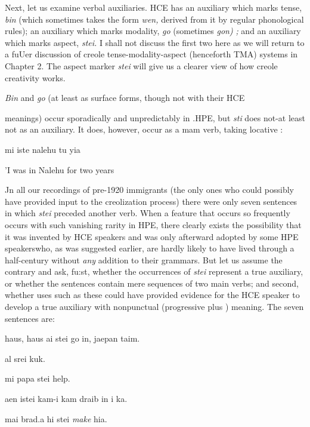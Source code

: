 Next, let us examine verbal auxiliaries. HCE has an auxiliary which marks tense, \textit{bin} (which sometimes takes the form \textit{wen,} derived from it by regular phonological rules); an auxiliary which marks modal\-ity, \textit{go }(sometimes \textit{go}\textit{n}\textit{)} \textit{; }and an auxiliary which marks aspect, \textit{stei.} I shall not discuss the first two here as we will return to a fuUer discus\-sion of creole tense-modality-aspect (henceforth TMA) systems in Chapter 2. The aspect marker \textit{stei} will give us a clearer view of how creole creativity works.

\textit{Bin }and \textit{go }(at least as surface forms, though not with their HCE

meanings) occur sporadically and unpredictably in .HPE, but \textit{s}\textit{t}\textit{i} does not-at least not as an auxiliary. It does, however, occur as a mam verb, taking locative :

\ea\label{ex:44}
 mi iste nalehu tu yia
\glt
\z

'I was in Nalehu for two years

Jn all our recordings of pre{}-1920 immigrants (the only ones who could possibly have provided input to the creolization process) there were only seven sentences in which \textit{stei} preceded another verb. When a feature that occurs so frequently  occurs with such vanishing rarity in HPE, there clearly exists the possibility that it was invented by HCE speakers and was only afterward adopted by some HPE speakers\-who, as was suggested earlier, are hardly likely to have lived through a half-century without \textit{any} addition to their grammars. But let us assume the contrary and ask, fu:st, whether the occurrences of \textit{stei} represent
a true auxiliary, or whether the sentences contain mere sequences of two main verbs; and second, whether uses such as these could have provided evidence for the HCE speaker to develop a true auxiliary with nonpunctual (progressive plus ) meaning. The seven sentences are:

\ea\label{ex:45}
 haus, haus ai stei go in, jaepan taim.
\glt
\z

\ea\label{ex:46}
 al srei kuk.
\glt
\z

\ea\label{ex:47}
 mi papa stei help.
\glt
\z

\ea\label{ex:48}
 aen istei kam-i kam draib in i ka.
\glt
\z

\ea\label{ex:49}
 mai brad.a hi stei \textit{make} hia.
\glt
\z

